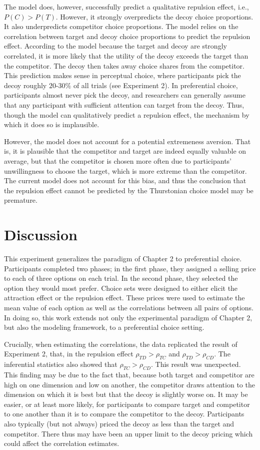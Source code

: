 The model does, however, successfully predict a qualitative repulsion effect, i.e., $P(C)>P(T)$. However, it strongly overpredicts the decoy choice proportions. It also underpredicts competitor choice proportions. The model relies on the correlation between target and decoy choice proportions to predict the repulsion effect. According to the model because the target and decoy are strongly correlated, it is more likely that the utility of the decoy exceeds the target than the competitor. The decoy then takes away choice shares from the competitor. This prediction makes sense in perceptual choice, where  participants pick the decoy roughly $20$-$30\%$ of all trials (see Experiment 2). In preferential choice, participants almost never pick the decoy, and researchers can generally assume that any participant with sufficient attention can target from the decoy. Thus, though the model can qualitatively predict a repulsion effect, the mechanism by which it does so is implausible.

However, the model does not account for a potential extremeness aversion. That is, it is plausible that the competitor and target are indeed equally valuable on average, but that the competitor is chosen more often due to participants' unwillingness to choose the target, which is more extreme than the competitor. The current model does not account for this bias, and thus the conclusion that the repulsion effect cannot be predicted by the Thurstonian choice model may be premature.

\section{Discussion}

This experiment generalizes the paradigm of Chapter 2 to preferential choice. Participants completed two phases; in the first phase, they assigned a selling price to each of three options on each trial. In the second phase, they selected the option they would most prefer. Choice sets were designed to either elicit the attraction effect or the repulsion effect. These prices were used to estimate the mean value of each option as well as the correlations between all pairs of options. In doing so, this work extends not only the experimental paradigm of Chapter 2, but also the modeling framework, to a preferential choice setting.

Crucially, when estimating the correlations, the data replicated the result of Experiment 2, that, in the repulsion effect $\rho_{TD}>\rho_{TC}$ and $\rho_{TD}>\rho_{CD}$. The inferential statistics also showed that $\rho_{TC}>\rho_{CD}$. This result was unexpected. This finding may be due to the fact that, because both target and competitor are high on one dimension and low on another, the competitor draws attention to the dimension on which it is best but that the decoy is slightly worse on. It may be easier, or at least more likely, for participants to compare target and competitor to one another than it is to compare the competitor to the decoy. Participants also typically (but not always) priced the decoy as less than the target and competitor. There thus may have been an upper limit to the decoy pricing which could affect the correlation estimates. 

